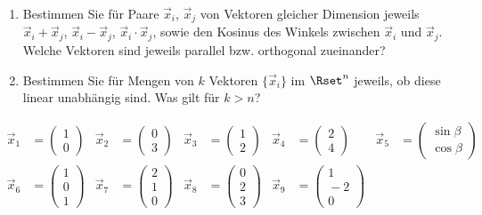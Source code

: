 
\begin{enumerate}
\item Bestimmen Sie für Paare $\vec{x}_i$, $\vec{x}_j$ von Vektoren gleicher Dimension jeweils $\vec{x}_i+\vec{x}_j$, $\vec{x}_i-\vec{x}_j$, $\vec{x}_i\cdot\vec{x}_j$, sowie den Kosinus des Winkels zwischen $\vec{x}_i$ und $\vec{x}_j$. Welche Vektoren sind jeweils parallel bzw. orthogonal zueinander?
\item Bestimmen Sie für Mengen von $k$ Vektoren $\{\vec{x}_i\}$ im $\Rset^n$ jeweils, ob diese linear unabhängig sind. Was gilt für $k>n$?
\end{enumerate}
\begin{align*}
\vec{x}_1&=\left(\begin{array}{c}1\\0\end{array}\right)
&\vec{x}_2&=\left(\begin{array}{c}0\\3\end{array}\right)
&\vec{x}_3&=\left(\begin{array}{c}1\\2\end{array}\right)
&\vec{x}_4&=\left(\begin{array}{c}2\\4\end{array}\right)
&\vec{x}_5&=\left(\begin{array}{c}\sin\beta\\\cos\beta\end{array}\right)\\
\vec{x}_6&=\left(\begin{array}{c}1\\0\\1\end{array}\right)
&\vec{x}_7&=\left(\begin{array}{c}2\\1\\0\end{array}\right)
&\vec{x}_8&=\left(\begin{array}{c}0\\2\\3\end{array}\right)
&\vec{x}_9&=\left(\begin{array}{c}1\\{}-2\\0\end{array}\right)

\end{align*}
